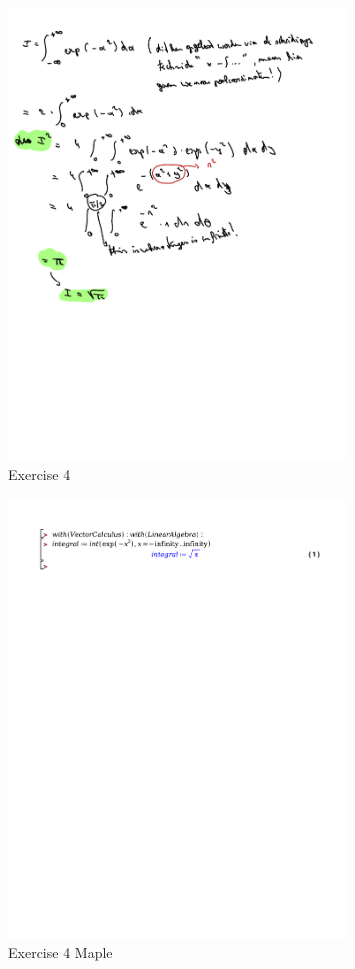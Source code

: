 \documentclass[a4paper]{report}
\begin{document}
\begin{figure}[H]
	\centering
	\includegraphics[width=0.8\textwidth]{assets/huis_5_ex_4.pdf}
	\caption{Exercise 4}
	\label{fig:huis_5_ex_4}
\end{figure}

\begin{figure}[H]
	\centering
	\includegraphics[width=0.8\textwidth]{exercises/huis_5_ex_4.pdf}
	\caption{Exercise 4 Maple}
	\label{fig:huis_5_ex_4_maple}
\end{figure}
\end{document}

